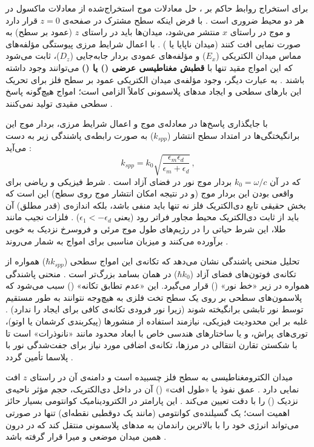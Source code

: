 \documentclass[12pt,a4paper]{report}
\begin{document}
برای استخراج روابط حاکم بر ، حل معادلات موج استخراج‌شده از معادلات ماکسول در هر دو محیط ضروری است \cite{maier}. با فرض اینکه سطح مشترک در صفحه‌ی $z=0$ قرار دارد و موج در راستای $x$ منتشر می‌شود، میدان‌ها باید در راستای $z$ (عمود بر سطح) به صورت نمایی افت کنند (میدان ناپایا یا ) \cite{maier,novotny}. با اعمال شرایط مرزی پیوستگی مؤلفه‌های مماس میدان الکتریکی ($E_x$) و مؤلفه‌های عمودی بردار جابه‌جایی ($D_z$)، ثابت می‌شود که این امواج مقید تنها با \textbf{قطبش مغناطیسی عرضی () یا ()} می‌توانند وجود داشته باشند \cite{maier,novotny}. به عبارت دیگر، وجود مؤلفه‌ی میدان الکتریکی عمود بر سطح فلز برای تحریک این بارهای سطحی و ایجاد مدهای پلاسمونی کاملاً الزامی است؛ امواج  هیچ‌گونه پاسخ سطحی مقیدی تولید نمی‌کنند \cite{maier}.

با جایگذاری پاسخ‌ها در معادله‌ی موج و اعمال شرایط مرزی، بردار موج این برانگیختگی‌ها در امتداد سطح انتشار ($k_{spp}$) به صورت رابطه‌ی پاشندگی زیر به دست می‌آید \cite{maier,novotny}:
\begin{equation}
k_{spp}=k_0\sqrt{\frac{\epsilon_m\epsilon_d}{\epsilon_m+\epsilon_d}}\,,
\end{equation}
که در آن $k_0=\omega/c$ بردار موج نور در فضای آزاد است \cite{maier}. شرط فیزیکی و ریاضی برای واقعی بودن این بردار موج (و در نتیجه امکان انتشار موج روی سطح) این است که بخش حقیقی تابع دی‌الکتریک فلز نه تنها باید منفی باشد، بلکه اندازه‌ی (قدر مطلق) آن باید از ثابت دی‌الکتریک محیط مجاور فراتر رود (یعنی $\epsilon_1<-\epsilon_d$) \cite{maier,novotny}. فلزات نجیب مانند طلا، این شرط حیاتی را در رژیم‌های طول موج مرئی و فروسرخ نزدیک به خوبی برآورده می‌کنند و میزبان مناسبی برای امواج  به شمار می‌روند \cite{maier}.

تحلیل منحنی پاشندگی  نشان می‌دهد که تکانه‌ی این امواج سطحی ($\hbar k_{spp}$) همواره از تکانه‌ی فوتون‌های فضای آزاد ($\hbar k_0$) در همان بسامد بزرگ‌تر است \cite{maier,novotny}. منحنی پاشندگی  همواره در زیر «خط نور» () قرار می‌گیرد. این «عدم تطابق تکانه» () سبب می‌شود که پلاسمون‌های سطحی بر روی یک سطح تخت فلزی به هیچ‌وجه نتوانند به طور مستقیم توسط نور تابشی برانگیخته شوند (زیرا نور فرودی تکانه‌ی کافی برای ایجاد  را ندارد) \cite{maier,novotny}. غلبه بر این محدودیت فیزیکی، نیازمند استفاده از منشورها (پیکربندی کرشمان یا اوتو)، توری‌های پراش، و یا ساختارهای هندسی خاص با ابعاد محدود مانند «نانوذرات» است تا با شکستن تقارن انتقالی در مرزها، تکانه‌ی اضافی مورد نیاز برای جفت‌شدگی نور با پلاسما تأمین گردد \cite{maier,novotny}.

میدان الکترومغناطیسی  به سطح فلز چسبیده است و دامنه‌ی آن در راستای $z$ افت نمایی دارد \cite{maier}. عمق نفوذ یا «طول افت» () آن در داخل دی‌الکتریک، حجم مؤثر ناحیه‌ی نزدیک () را با دقت تعیین می‌کند \cite{novotny,maier}. این پارامتر در الکترودینامیک کوانتومی بسیار حائز اهمیت است؛ یک گسیلنده‌ی کوانتومی (مانند یک دوقطبی نقطه‌ای) تنها در صورتی می‌تواند انرژی خود را با بالاترین راندمان به مدهای پلاسمونی منتقل کند که در درون همین میدان موضعی و میرا قرار گرفته باشد \cite{novotny,maier}.
\end{document}
